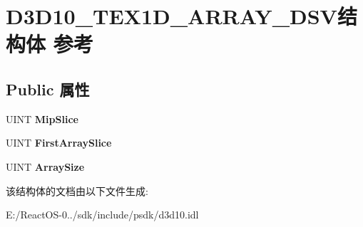 \hypertarget{struct_d3_d10___t_e_x1_d___a_r_r_a_y___d_s_v}{}\section{D3\+D10\+\_\+\+T\+E\+X1\+D\+\_\+\+A\+R\+R\+A\+Y\+\_\+\+D\+S\+V结构体 参考}
\label{struct_d3_d10___t_e_x1_d___a_r_r_a_y___d_s_v}
\subsection*{Public 属性}
\begin{DoxyCompactItemize}
\item 
\mbox{\label{struct_d3_d10___t_e_x1_d___a_r_r_a_y___d_s_v_a0987633a2d3772a7c7d289b8664a5967}} 
U\+I\+NT {\bfseries Mip\+Slice}
\item 
\mbox{\label{struct_d3_d10___t_e_x1_d___a_r_r_a_y___d_s_v_a81aa18a9c3f68fce09729945b40cbf66}} 
U\+I\+NT {\bfseries First\+Array\+Slice}
\item 
\mbox{\label{struct_d3_d10___t_e_x1_d___a_r_r_a_y___d_s_v_a83a560323e324ab38dcbf4914a629cdd}} 
U\+I\+NT {\bfseries Array\+Size}
\end{DoxyCompactItemize}


该结构体的文档由以下文件生成\+:\begin{DoxyCompactItemize}
\item 
E\+:/\+React\+O\+S-\/0../sdk/include/psdk/d3d10.\+idl\end{DoxyCompactItemize}
